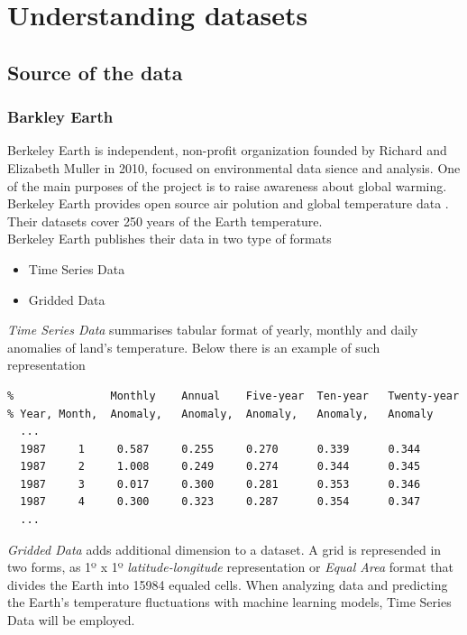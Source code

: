 \chapter{Understanding datasets}

\section{Source of the data}

\subsection{Barkley Earth}

Berkeley Earth is independent, non-profit organization founded by Richard and Elizabeth Muller in 2010, focused on environmental data sience and analysis. 
One of the main purposes of the project is to raise awareness about global warming. 
Berkeley Earth provides open source air polution and global temperature data \cite{berkeleyearthdata}. 
Their datasets cover 250 years of the Earth temperature.
\\Berkeley Earth publishes their data in two type of formats
\begin{itemize}
    \item Time Series Data
    \item Gridded Data
\end{itemize}

{\it Time Series Data} summarises tabular format of yearly, monthly and daily anomalies of land's temperature. 
Below there is an example of such representation
\begin{verbatim}
%               Monthly    Annual    Five-year  Ten-year   Twenty-year
% Year, Month,  Anomaly,   Anomaly,  Anomaly,   Anomaly,   Anomaly
  ...
  1987     1     0.587     0.255     0.270      0.339      0.344
  1987     2     1.008     0.249     0.274      0.344      0.345
  1987     3     0.017     0.300     0.281      0.353      0.346
  1987     4     0.300     0.323     0.287      0.354      0.347
  ...
\end{verbatim}

{\it Gridded Data} adds additional dimension to a dataset. A grid is represended in two forms, as 1º x 1º {\it latitude-longitude} representation or {\it Equal Area} format that divides the Earth into 15984 equaled cells.
When analyzing data and predicting the Earth's temperature fluctuations with machine learning models, Time Series Data will be employed.

